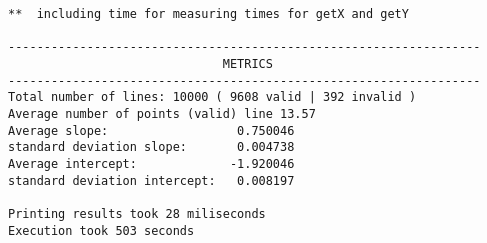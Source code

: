 \begin{verbatim}
**  including time for measuring times for getX and getY

------------------------------------------------------------------
                              METRICS                             
------------------------------------------------------------------
Total number of lines: 10000 ( 9608 valid | 392 invalid ) 
Average number of points (valid) line 13.57 
Average slope:                  0.750046      
standard deviation slope:       0.004738 
Average intercept:             -1.920046  
standard deviation intercept:   0.008197 

Printing results took 28 miliseconds
Execution took 503 seconds
\end{verbatim}
